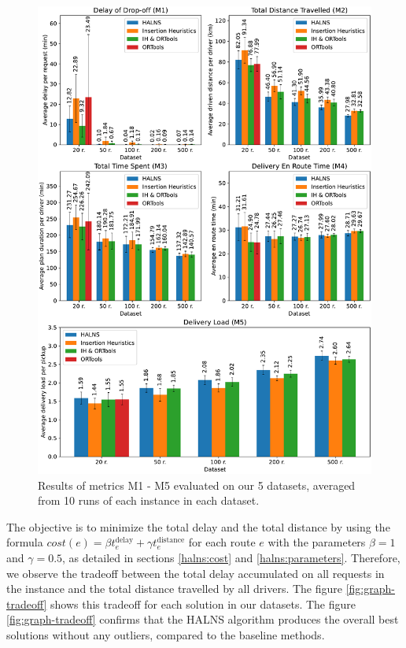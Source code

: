     \begin{figure}[!ht]
        \centering
        \includegraphics[width=\textwidth]{figures/metrics-graphs.pdf}
        \caption{Results of metrics M1 - M5 evaluated on our 5 datasets, averaged from 10 runs of each instance in each dataset.}
        \label{fig:metrics-graphs}
    \end{figure}
    
    
    The objective is to minimize the total delay and the total distance by using the formula $cost(e) = \beta t^{\mathrm{delay}}_e + \gamma t^{\mathrm{distance}}_e$ for each route $e$ with the parameters $\beta = 1$ and $\gamma = 0.5$, as detailed in sections \ref{halns:cost} and \ref{halns:parameters}. Therefore, we observe the tradeoff between the total delay accumulated on all requests in the instance and the total distance travelled by all drivers. The figure \ref{fig:graph-tradeoff} shows this tradeoff for each solution in our datasets. The figure \ref{fig:graph-tradeoff} confirms that the HALNS algorithm produces the overall best solutions without any outliers, compared to the baseline methods.
    
